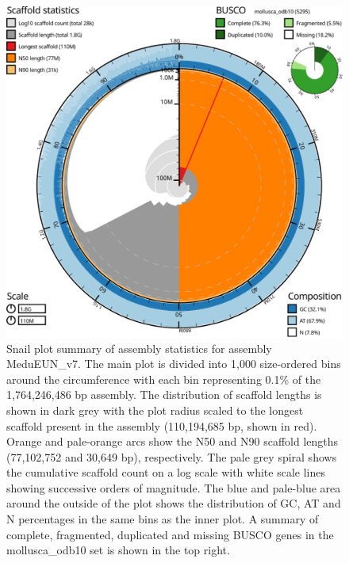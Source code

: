 \documentclass[11pt, a4paper]{article}
\begin{document}
\begin{figure}
	\includegraphics[width=\linewidth]{figures/btk_snail_MeduEUN_v7}
	\caption{Snail plot summary of assembly statistics for assembly MeduEUN\_v7. The main plot is divided into 1,000 size-ordered bins around the circumference with each bin representing 0.1\% of the 1,764,246,486 bp assembly. The distribution of scaffold lengths is shown in dark grey with the plot radius scaled to the longest scaffold present in the assembly (110,194,685 bp, shown in red). Orange and pale-orange arcs show the N50 and N90 scaffold lengths (77,102,752 and 30,649 bp), respectively. The pale grey spiral shows the cumulative scaffold count on a log scale with white scale lines showing successive orders of magnitude. The blue and pale-blue area around the outside of the plot shows the distribution of GC, AT and N percentages in the same bins as the inner plot. A summary of complete, fragmented, duplicated and missing BUSCO genes in the mollusca\_odb10 set is shown in the top right.}
	\label{supfig:btk-snail-MeduEUN}
\end{figure}
\end{document}
